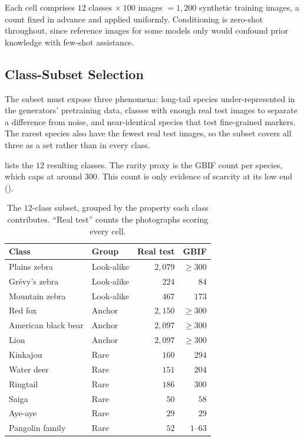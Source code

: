 Each cell comprises $12$ classes $\times\ 100$ images $= 1{,}200$ synthetic training images, a count fixed in advance and applied uniformly. Conditioning is zero-shot throughout, since reference images for some models only would confound prior knowledge with few-shot assistance.

\subsection{Class-Subset Selection}\label{sec:generator_comparison_classes}

The subset must expose three phenomena: long-tail species under-represented in the generators' pretraining data, classes with enough real test images to separate a difference from noise, and near-identical species that test fine-grained markers. The rarest species also have the fewest real test images, so the subset covers all three as a set rather than in every class.

 lists the $12$ resulting classes. The rarity proxy is the GBIF count per species, which caps at around $300$. This count is only evidence of scarcity at its low end ().

\begin{table}[htbp]
\centering
\caption[The twelve-class comparison subset]{The $12$-class subset, grouped by the property each class contributes. \enquote{Real test} counts the photographs scoring every cell.}
\label{tab:generator-comparison-classes}
\begin{tabular}{@{}llrr@{}}
\toprule
Class & Group & Real test & GBIF \\
\midrule
Plains zebra & Look-alike & $2{,}079$ & $\geq 300$ \\
Grévy's zebra & Look-alike & $224$ & $84$ \\
Mountain zebra & Look-alike & $467$ & $173$ \\
\midrule
Red fox & Anchor & $2{,}150$ & $\geq 300$ \\
American black bear & Anchor & $2{,}097$ & $\geq 300$ \\
Lion & Anchor & $2{,}097$ & $\geq 300$ \\
\midrule
Kinkajou & Rare & $160$ & $294$ \\
Water deer & Rare & $151$ & $204$ \\
Ringtail & Rare & $186$ & $300$ \\
Saiga & Rare & $50$ & $58$ \\
Aye-aye & Rare & $29$ & $29$ \\
Pangolin family & Rare & $52$ & $1$--$63$ \\
\bottomrule
\end{tabular}
\end{table}

